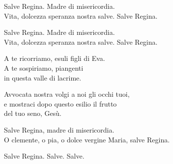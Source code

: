 
Salve Regina. Madre di misericordia.\\
Vita, dolcezza speranza nostra salve. Salve Regina.

\spazio

Salve Regina. Madre di misericordia.\\
Vita, dolcezza speranza nostra salve. Salve Regina.

\spazio

A te ricorriamo, esuli figli di Eva.\\
A te sospiriamo, piangenti\\
in questa valle di lacrime.

\spazio

Avvocata nostra volgi a noi gli occhi tuoi,\\
e mostraci dopo questo esilio il frutto\\
del tuo seno, Gesù.

\spazio

Salve Regina, madre di misericordia.\\
O clemente, o pia, o dolce vergine Maria, salve Regina.

\spazio

Salve Regina. Salve. Salve.